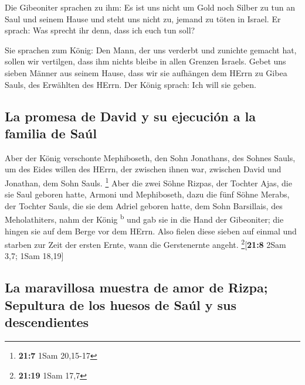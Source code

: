  Die Gibeoniter sprachen zu ihm: Es ist uns nicht um Gold
noch Silber zu tun an Saul und seinem Hause und steht uns nicht zu,
jemand zu töten in Israel. Er sprach: Was sprecht ihr denn, dass ich
euch tun soll?

 Sie sprachen zum König: Den Mann, der uns verderbt und
zunichte gemacht hat, sollen wir vertilgen, dass ihm nichts bleibe in
allen Grenzen Israels.  Gebet uns sieben Männer aus seinem
Hause, dass wir sie aufhängen dem HErrn zu Gibea Sauls, des Erwählten
des HErrn. Der König sprach: Ich will sie geben.

\hypertarget{la-promesa-de-david-y-su-ejecuciuxf3n-a-la-familia-de-sauxfal}{%
\subsection{La promesa de David y su ejecución a la familia de
Saúl}\label{la-promesa-de-david-y-su-ejecuciuxf3n-a-la-familia-de-sauxfal}}

 Aber der König verschonte Mephiboseth, den Sohn
Jonathans, des Sohnes Sauls, um des Eides willen des HErrn, der zwischen
ihnen war, zwischen David und Jonathan, dem Sohn Sauls. \footnote{\textbf{21:7}
  1Sam 20,15-17}  Aber die zwei Söhne Rizpas, der Tochter
Ajas, die sie Saul geboren hatte, Armoni und Mephiboseth, dazu die fünf
Söhne Merabs, der Tochter Sauls, die sie dem Adriel geboren hatte, dem
Sohn Barsillais, des Meholathiters, nahm der König \textsuperscript{b}
 und gab sie in die Hand der Gibeoniter; die hingen sie
auf dem Berge vor dem HErrn. Also fielen diese sieben auf einmal und
starben zur Zeit der ersten Ernte, wann die Gerstenernte angeht.
\footnote{\textbf{21:19} 1Sam 17,7}{[}\textbf{21:8} 2Sam 3,7; 1Sam
18,19{]}

\hypertarget{la-maravillosa-muestra-de-amor-de-rizpa-sepultura-de-los-huesos-de-sauxfal-y-sus-descendientes}{%
\subsection{La maravillosa muestra de amor de Rizpa; Sepultura de los
huesos de Saúl y sus
descendientes}\label{la-maravillosa-muestra-de-amor-de-rizpa-sepultura-de-los-huesos-de-sauxfal-y-sus-descendientes}}

